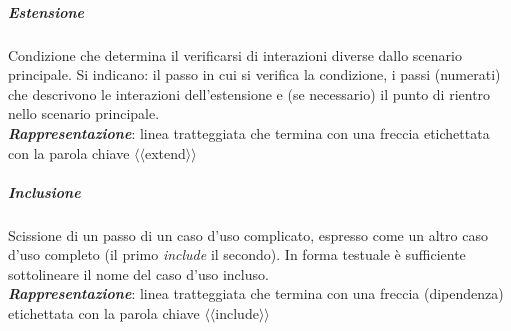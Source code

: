 \subparagraph{Estensione} Condizione che determina il verificarsi di interazioni diverse dallo scenario principale. Si indicano: il passo in cui si verifica la condizione, i passi (numerati) che descrivono le interazioni dell'estensione e (se necessario) il punto di rientro nello scenario principale.\\
\textbf{\textit{Rappresentazione}}: linea tratteggiata che termina con una freccia etichettata con la parola chiave $\langle\langle$extend$\rangle\rangle$

\begin{figure}[h!]
  \centering
  \hfill
\end{figure}

\subparagraph{Inclusione} Scissione di un passo di un caso d'uso complicato, espresso come un altro caso d'uso completo (il primo \textit{include} il secondo). In forma testuale è sufficiente sottolineare il nome del caso d'uso incluso.\\
\textbf{\textit{Rappresentazione}}: linea tratteggiata che termina con una freccia (dipendenza) etichettata con la parola chiave $\langle\langle$include$\rangle\rangle$

\newpage